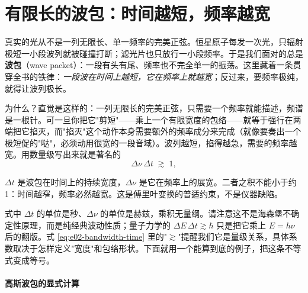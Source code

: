 \section{有限长的波包：时间越短，频率越宽}
\label{sec:e02-wavepacket}

真实的光从不是一列无限长、单一频率的完美正弦。恒星原子每发一次光，只辐射极短一小段波列就被碰撞打断；滤光片也只放行一小段频率。于是我们面对的总是\textbf{波包}（wave packet）：一段有头有尾、频率也不完全单一的振荡。这里藏着一条贯穿全书的铁律：\emph{一段波在时间上越短，它在频率上就越宽}；反过来，要频率极纯，就得让波列极长。

为什么？直觉是这样的：一列无限长的完美正弦，只需要一个频率就能描述，频谱是一根针。可一旦你把它"剪短"——乘上一个有限宽度的包络——就等于强行在两端把它掐灭，而"掐灭"这个动作本身需要额外的频率成分来完成（就像要奏出一个极短促的"哒"，必须动用很宽的一段音域）。波列越短，掐得越急，需要的频率越宽。用数量级写出来就是著名的
\begin{equation}
  \Delta\nu\,\Delta t \;\gtrsim\; 1 ,
  \label{eq:e02-bandwidth-time}
\end{equation}
\begin{formulaexplain}
\(\Delta t\) 是波包在时间上的持续宽度，\(\Delta\nu\) 是它在频率上的展宽。二者之积不能小于约 1：时间越窄，频率必然越宽。这是傅里叶变换的普适约束，不是仪器缺陷。
\end{formulaexplain}
式中 \(\Delta t\) 的单位是秒、\(\Delta\nu\) 的单位是赫兹，乘积无量纲。请注意这不是海森堡不确定性原理，而是纯经典波动性质；量子力学的 \(\Delta E\,\Delta t\gtrsim\hbar\) 只是把它乘上 \(E=h\nu\) 后的翻版。式 \eqref{eq:e02-bandwidth-time} 里的"\(\gtrsim\)"提醒我们它是量级关系，具体系数取决于怎样定义"宽度"和包络形状。下面就用一个能算到底的例子，把这条不等式变成等号。

\paragraph{高斯波包的显式计算}

